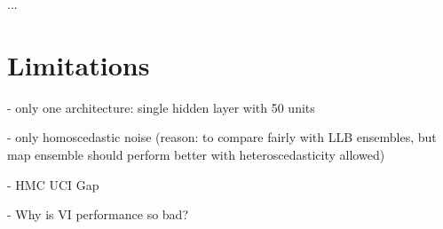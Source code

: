 \documentclass[../thesis.tex]{subfiles}
\begin{document}
...

\section{Limitations}
- only one architecture: single hidden layer with 50 units

- only homoscedastic noise (reason: to compare fairly with LLB ensembles, but map ensemble should perform better with heteroscedasticity allowed)

- HMC UCI Gap

- Why is VI performance so bad?
\end{document}
